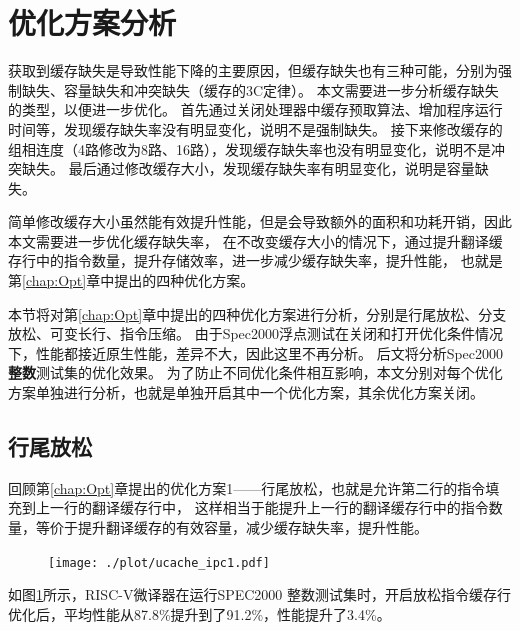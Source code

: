 \section{优化方案分析}

获取到缓存缺失是导致性能下降的主要原因，但缓存缺失也有三种可能，分别为强制缺失、容量缺失和冲突缺失（缓存的3C定律）。
本文需要进一步分析缓存缺失的类型，以便进一步优化。
首先通过关闭处理器中缓存预取算法、增加程序运行时间等，发现缓存缺失率没有明显变化，说明不是强制缺失。
接下来修改缓存的组相连度（4路修改为8路、16路），发现缓存缺失率也没有明显变化，说明不是冲突缺失。
最后通过修改缓存大小，发现缓存缺失率有明显变化，说明是容量缺失。

简单修改缓存大小虽然能有效提升性能，但是会导致额外的面积和功耗开销，因此本文需要进一步优化缓存缺失率，
在不改变缓存大小的情况下，通过提升翻译缓存行中的指令数量，提升存储效率，进一步减少缓存缺失率，提升性能，
也就是第\ref{chap:Opt}章中提出的四种优化方案。

本节将对第\ref{chap:Opt}章中提出的四种优化方案进行分析，分别是行尾放松、分支放松、可变长行、指令压缩。
由于Spec2000浮点测试在关闭和打开优化条件情况下，性能都接近原生性能，差异不大，因此这里不再分析。
后文将分析Spec2000\textbf{整数}测试集的优化效果。
为了防止不同优化条件相互影响，本文分别对每个优化方案单独进行分析，也就是单独开启其中一个优化方案，其余优化方案关闭。

\subsection{行尾放松}

回顾第\ref{chap:Opt}章提出的优化方案1——行尾放松，也就是允许第二行的指令填充到上一行的翻译缓存行中，
这样相当于能提升上一行的翻译缓存行中的指令数量，等价于提升翻译缓存的有效容量，减少缓存缺失率，提升性能。

\begin{figure}[!htbp]
  \centering
  \texttt{[image: ./plot/ucache\_ipc1.pdf]}
  \label{img:ipc1}
\end{figure}

如图\ref{img:ipc1}所示，RISC-V微译器在运行SPEC2000 整数测试集时，开启放松指令缓存行优化后，平均性能从87.8\%提升到了91.2\%，性能提升了3.4\%。

